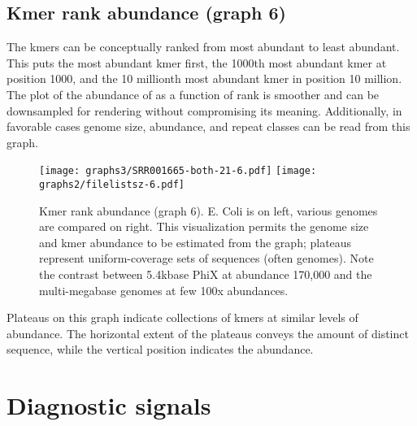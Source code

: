 \documentclass[11pt,fullpage]{article}
\begin{document}
\subsection{Kmer rank abundance (graph 6)}
The kmers can be conceptually ranked from most abundant to least abundant.  This puts the
most abundant kmer first, the 1000th most abundant kmer at position 1000, and the 10 millionth
most abundant kmer in position 10 million.  The plot of the abundance of as a function of rank 
is smoother and can be downsampled for rendering without compromising its meaning.
Additionally, in favorable cases genome size, abundance, and repeat classes can be read from 
this graph.

\begin{figure}
\begin{center}
\texttt{[image: graphs3/SRR001665-both-21-6.pdf]} \texttt{[image: graphs2/filelistsz-6.pdf]}
\end{center}
\caption{Kmer rank abundance (graph 6).  E. Coli is on left, various genomes are compared on right.  This visualization
permits the genome size and kmer abundance to be estimated from the graph; plateaus represent 
uniform-coverage sets of sequences (often genomes).  Note the contrast between 5.4kbase PhiX 
at abundance 170,000 and the multi-megabase genomes at few 100x abundances. }
\label{graph6}
\end{figure}

Plateaus on this graph indicate  collections of kmers at similar levels of abundance.  The
horizontal extent of the plateaus conveys the amount of distinct sequence, while the vertical
position indicates the abundance.

\section{Diagnostic signals}
\end{document}
